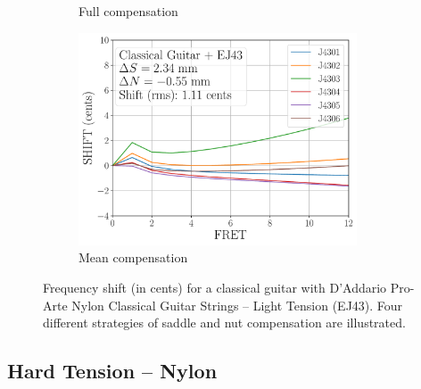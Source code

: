 \begin{figure}
\begin{subfigure}[b]{0.45\textwidth}
   \caption{Full compensation}
   \label{fig:shift_classicalguitar_ej43_full}
  \end{subfigure}
  \hspace{0.25in}
  \begin{subfigure}[b]{0.45\textwidth}
   \centering
   \includegraphics[width=3.25in]{figures/shift_classicalguitar_ej43_mean}
   \caption{Mean compensation}
   \label{fig:shift_classicalguitar_ej43_mean}
  \end{subfigure}
  \caption{\label{fig:compensation_classicalguitar_ej43} Frequency shift (in cents) for a classical guitar with D'Addario Pro-Arte Nylon Classical Guitar Strings -- Light Tension (EJ43). Four different strategies of saddle and nut compensation are illustrated.}
 \end{figure}

 \newpage
 \subsection{Hard Tension -- Nylon}


